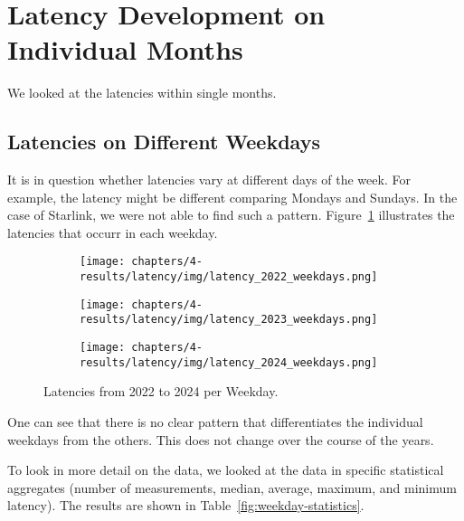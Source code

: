 \section{Latency Development on Individual Months}
\label{sec:latency-individual-months}

We looked at the latencies within single months.

\subsection{Latencies on Different Weekdays}
\label{sec:latency-weekdays}

It is in question whether latencies vary at different days of the week. For
example, the latency might be different comparing Mondays and Sundays. In the
case of Starlink, we were not able to find such a pattern.
Figure~\ref{fig:latencies-per-weekday} illustrates the latencies that occurr in
each weekday.

\begin{figure}
	\centering
	\begin{subfigure}[b]{0.32\linewidth}
		\texttt{[image: chapters/4-results/latency/img/latency\_2022\_weekdays.png]}
	\end{subfigure}
	\begin{subfigure}[b]{0.32\linewidth}
		\texttt{[image: chapters/4-results/latency/img/latency\_2023\_weekdays.png]}
	\end{subfigure}
	\begin{subfigure}[b]{0.32\linewidth}
		\texttt{[image: chapters/4-results/latency/img/latency\_2024\_weekdays.png]}
	\end{subfigure}
	\caption{Latencies from 2022 to 2024 per Weekday.}
	\label{fig:latencies-per-weekday}
\end{figure}

One can see that there is no clear pattern that differentiates the individual
weekdays from the others. This does not change over the course of the years.

To look in more detail on the data, we looked at the data in specific
statistical aggregates (number of measurements, median, average, maximum, and
minimum latency). The results are shown in Table~\ref{fig:weekday-statistics}.

